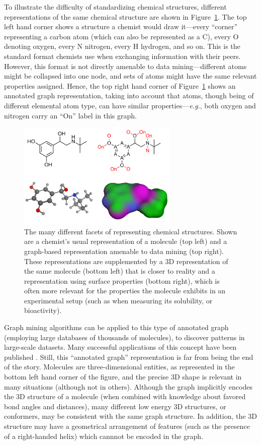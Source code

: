\documentclass{sig-alternate}
\begin{document}
To illustrate the difficulty of standardizing chemical structures,
different representations of the same chemical structure are shown in
Figure~\ref{figure:chemical-structures}. The top left hand corner
shows a structure a chemist would draw it---every ``corner''
representing a carbon atom (which can also be represented as a C),
every O denoting oxygen, every N nitrogen, every H hydrogen, and so
on. This is the standard format chemists use when exchanging
information with their peers.  However, this format is not directly
amenable to data mining---different atoms might be collapsed into one
node, and sets of atoms might have the same relevant properties
assigned. Hence, the top right hand corner of
Figure~\ref{figure:chemical-structures} shows an annotated graph
representation, taking into account that atoms, though being of
different elemental atom type, can have similar
properties---\emph{e.g.}, both oxygen and nitrogen carry an ``On''
label in this graph.

\begin{figure}
\centering
\includegraphics[height=2in]{chemical-structures.png}
\caption{The many different facets of representing chemical structures. Shown
are a chemist's usual representation of a molecule (top left) and a
graph-based representation amenable to data mining (top right). These
representations are supplemented by a 3D representation of the same molecule
(bottom left) that is closer to reality and a representation using surface
properties (bottom right), which is often more relevant for the properties the
molecule exhibits in an experimental setup (such as when measuring its
solubility, or bioactivity).}
\label{figure:chemical-structures}
\end{figure}

Graph mining algorithms can be applied to this type of annotated graph
(employing large databases of thousands of molecules), to discover
patterns in large-scale datasets.  Many successful applications of
this concept have been published \cite{wegner2006,horst2009}. Still,
this ``annotated graph'' representation is far from being the end of
the story. Molecules are three-dimensional entities, as represented in
the bottom left hand corner of the figure, and the precise 3D shape is
relevant in many situations (although not in others). Although the
graph implicitly encodes the 3D structure of a molecule (when combined
with knowledge about favored bond angles and distances), many
different low energy 3D structures, or conformers, may be consistent
with the same graph structure. In addition, the 3D structure may have
a geometrical arrangement of features (such as the presence of a
right-handed helix) which cannnot be encoded in the graph.
\end{document}
